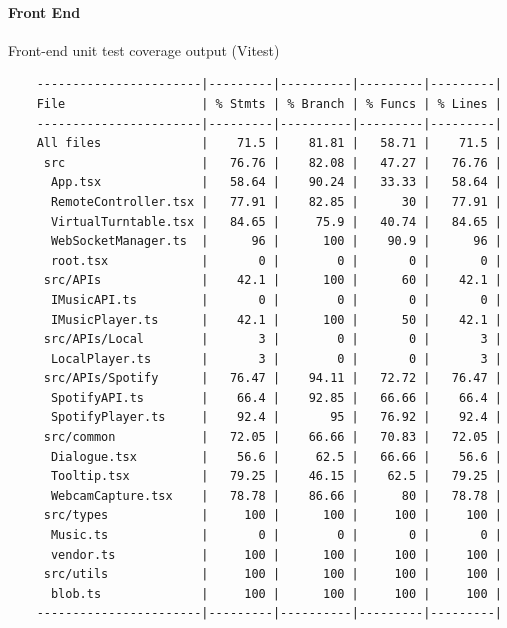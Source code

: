 \begin{uomappendix}
                \paragraph{Front End}
                \begin{table}[H]
                    \centering
                    \caption{Front-end unit test coverage output (Vitest)}
                    \begin{verbatim}
    -----------------------|---------|----------|---------|---------|
    File                   | % Stmts | % Branch | % Funcs | % Lines |
    -----------------------|---------|----------|---------|---------|
    All files              |    71.5 |    81.81 |   58.71 |    71.5 |
     src                   |   76.76 |    82.08 |   47.27 |   76.76 |
      App.tsx              |   58.64 |    90.24 |   33.33 |   58.64 |
      RemoteController.tsx |   77.91 |    82.85 |      30 |   77.91 |
      VirtualTurntable.tsx |   84.65 |     75.9 |   40.74 |   84.65 |
      WebSocketManager.ts  |      96 |      100 |    90.9 |      96 |
      root.tsx             |       0 |        0 |       0 |       0 |
     src/APIs              |    42.1 |      100 |      60 |    42.1 |
      IMusicAPI.ts         |       0 |        0 |       0 |       0 |
      IMusicPlayer.ts      |    42.1 |      100 |      50 |    42.1 |
     src/APIs/Local        |       3 |        0 |       0 |       3 |
      LocalPlayer.ts       |       3 |        0 |       0 |       3 |
     src/APIs/Spotify      |   76.47 |    94.11 |   72.72 |   76.47 |
      SpotifyAPI.ts        |    66.4 |    92.85 |   66.66 |    66.4 |
      SpotifyPlayer.ts     |    92.4 |       95 |   76.92 |    92.4 |
     src/common            |   72.05 |    66.66 |   70.83 |   72.05 |
      Dialogue.tsx         |    56.6 |     62.5 |   66.66 |    56.6 |
      Tooltip.tsx          |   79.25 |    46.15 |    62.5 |   79.25 |
      WebcamCapture.tsx    |   78.78 |    86.66 |      80 |   78.78 |
     src/types             |     100 |      100 |     100 |     100 |
      Music.ts             |       0 |        0 |       0 |       0 |
      vendor.ts            |     100 |      100 |     100 |     100 |
     src/utils             |     100 |      100 |     100 |     100 |
      blob.ts              |     100 |      100 |     100 |     100 |
    -----------------------|---------|----------|---------|---------|
                    \end{verbatim}
                \end{table}
    

\end{uomappendix}
